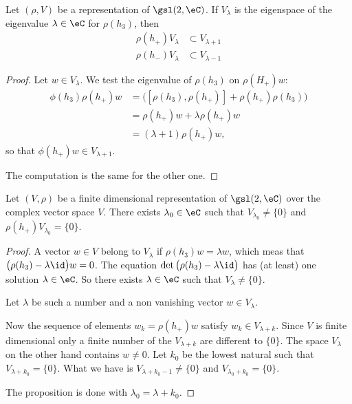 \begin{lemma}     \label{LEMooDGUYooPUkDNr}
	Let \( (\rho, V)\) be a representation of \( \gsl(2,\eC)\). If \( V_{\lambda}\) is the eigenspace of the eigenvalue \( \lambda\in \eC\) for \( \rho(h_3)\), then
	\begin{subequations}
		\begin{align}
			\rho(h_+)V_{\lambda} & \subset V_{\lambda+1} \\
			\rho(h_-)V_{\lambda} & \subset V_{\lambda-1}
		\end{align}
	\end{subequations}
\end{lemma}

\begin{proof}
	Let \( w\in V_{\lambda}\). We test the eigenvalue of \( \rho(h_3)\) on \( \rho(H_+)w\):
	\begin{subequations}
		\begin{align}
			\phi(h_3)\rho(h_+)w & =\big( [\rho(h_3),\rho(h_+)]+\rho(h_+)\rho(h_3) \big) \\
			                    & =\rho(h_+)w+\lambda\rho(h_+)w                         \\
			                    & =(\lambda+1)\rho(h_+)w,
		\end{align}
	\end{subequations}
	so that \( \phi(h_+)w\in V_{\lambda+1}\).

	The computation is the same for the other one.
\end{proof}

\begin{lemma}           \label{LEMooWXDYooUyijnm}
	Let \( (V,\rho)\) be a finite dimensional representation of \( \gsl(2,\eC)\) over the complex vector space \( V\). There exists \( \lambda_0\in \eC\) such that \( V_{\lambda_0}\neq \{ 0 \}\) and \( \rho(h_+)V_{\lambda_0}=\{ 0 \}\).
\end{lemma}

\begin{proof}
	A vector \( w\in V\) belong to \( V_{\lambda}\) if \( \rho(h_3)w=\lambda w\), which meas that \( \big( \rho(h_3)-\lambda\id \big)w=0\). The equation \( \det\big( \rho(h_3)-\lambda\id \big)\) has (at least) one solution \( \lambda\in \eC\). So there exists \( \lambda\in \eC\) such that \( V_{\lambda}\neq \{ 0 \}\).

	Let \( \lambda\) be such a number and a non vanishing vector \( w\in V_{\lambda}\).

	Now the sequence of elements \( w_k= \rho(h_+)w   \) satisfy \( w_k\in V_{\lambda+k}\). Since \( V\) is finite dimensional only a finite number of the \( V_{\lambda+k}\) are different to \( \{ 0 \}\). The space \( V_{\lambda}\) on the other hand contains \( w\neq 0\). Let \( k_0\) be the lowest natural such that \( V_{\lambda+k_0}=\{ 0 \}\). What we have is \( V_{\lambda+k_0-1}\neq \{ 0 \}\) and \( V_{\lambda_0+k_0}=\{ 0 \}\).

	The proposition is done with \( \lambda_0=\lambda+k_0\).
\end{proof}

